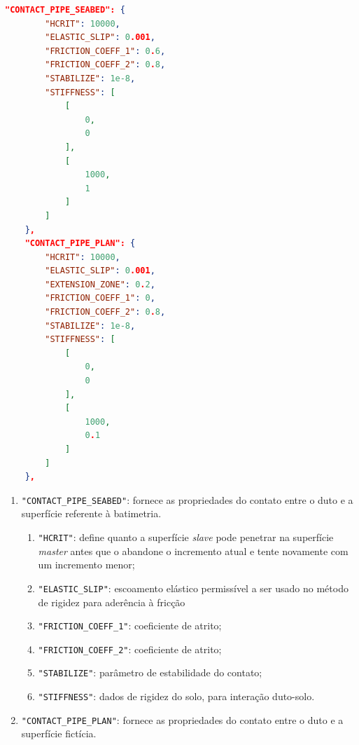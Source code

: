 \begin{lstlisting}[firstnumber=102, language=json, label={tab:jdsn-arquivojson4}, caption={Exemplo de arquivo de entrada de dados - Parte 4/7}]
    "CONTACT_PIPE_SEABED": {
        "HCRIT": 10000,
        "ELASTIC_SLIP": 0.001,
        "FRICTION_COEFF_1": 0.6,
        "FRICTION_COEFF_2": 0.8,
        "STABILIZE": 1e-8,
        "STIFFNESS": [
            [
                0,
                0
            ],
            [
                1000,
                1
            ]
        ]
    },
    "CONTACT_PIPE_PLAN": {
        "HCRIT": 10000,
        "ELASTIC_SLIP": 0.001,
        "EXTENSION_ZONE": 0.2,
        "FRICTION_COEFF_1": 0,
        "FRICTION_COEFF_2": 0.8,
        "STABILIZE": 1e-8,
        "STIFFNESS": [
            [
                0,
                0
            ],
            [
                1000,
                0.1
            ]
        ]
    },
\end{lstlisting}

\begin{enumerate}
    \item \texttt{"CONTACT\_PIPE\_SEABED"}: fornece as propriedades do contato entre o duto e a superfície referente à batimetria.
    \begin{enumerate}
        \item \texttt{"HCRIT"}: define quanto a superfície \textit{slave} pode penetrar na superfície \textit{master} antes que o \abaqus abandone o incremento atual e tente novamente com um incremento menor;
        \item \texttt{"ELASTIC\_SLIP"}: escoamento elástico permissível a ser usado no método de rigidez para aderência à fricção
        \item \texttt{"FRICTION\_COEFF\_1"}: coeficiente de atrito;
        \item \texttt{"FRICTION\_COEFF\_2"}: coeficiente de atrito;
        \item \texttt{"STABILIZE"}: parâmetro de estabilidade do contato;
        \item \texttt{"STIFFNESS"}: dados de rigidez do solo, para interação duto-solo.
    \end{enumerate}
    \item \texttt{"CONTACT\_PIPE\_PLAN"}: fornece as propriedades do contato entre o duto e a superfície fictícia.
\end{enumerate}


